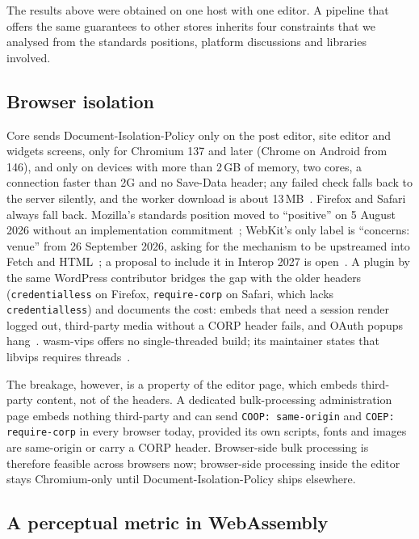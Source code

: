 \documentclass[sigconf,nonacm,screen]{acmart}
\begin{document}
The results above were obtained on one host with one editor. A pipeline that offers the same guarantees to other stores inherits four constraints that we analysed from the standards positions, platform discussions and libraries involved.

\subsection{Browser isolation}

Core sends Document-Isolation-Policy only on the post editor, site editor and widgets screens, only for Chromium 137 and later (Chrome on Android from 146), and only on devices with more than 2\,GB of memory, two cores, a connection faster than 2G and no Save-Data header; any failed check falls back to the server silently, and the worker download is about 13\,MB~\cite{wp71devnote}. Firefox and Safari always fall back. Mozilla's standards position moved to ``positive'' on 5 August 2026 without an implementation commitment~\cite{mozilla1074}; WebKit's only label is ``concerns: venue'' from 26 September 2026, asking for the mechanism to be upstreamed into Fetch and HTML~\cite{webkit399}; a proposal to include it in Interop 2027 is open~\cite{interop1332}. A plugin by the same WordPress contributor bridges the gap with the older headers (\texttt{credentialless} on Firefox, \texttt{require-corp} on Safari, which lacks \texttt{credentialless}) and documents the cost: embeds that need a session render logged out, third-party media without a CORP header fails, and OAuth popups hang~\cite{csme}. wasm-vips offers no single-threaded build; its maintainer states that libvips requires threads~\cite{wasmvips}.

The breakage, however, is a property of the editor page, which embeds third-party content, not of the headers. A dedicated bulk-processing administration page embeds nothing third-party and can send \texttt{COOP: same-origin} and \texttt{COEP: require-corp} in every browser today, provided its own scripts, fonts and images are same-origin or carry a CORP header. Browser-side bulk processing is therefore feasible across browsers now; browser-side processing inside the editor stays Chromium-only until Document-Isolation-Policy ships elsewhere.

\subsection{A perceptual metric in WebAssembly}
\end{document}
